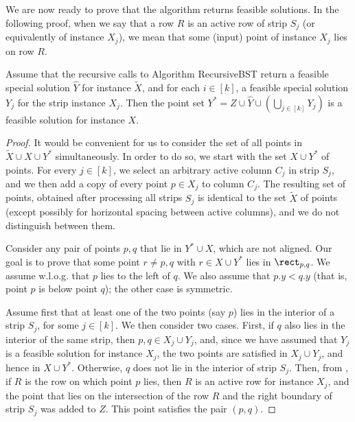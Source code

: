 We are now ready to prove that the algorithm returns feasible solutions.
In the following proof, when we say that a row $R$ is an active row of strip $S_j$ (or equivalently of instance $X_j$), we mean that some (input) point of instance $X_j$ lies on row $R$.


\begin{theorem} \label{thm: algorithm feasibility}
	Assume that the recursive calls to Algorithm {\sc RecursiveBST} return a feasible special solution $\hat Y$ for instance $\widetilde{X}$, and for each $i\in [k]$, a feasible special solution $Y_j$ for the strip instance $X_j$. Then the point set $Y^*=Z \cup \hat{Y} \cup (\bigcup_{j \in [k]} Y_j)$ is a feasible solution for instance $X$. 
\end{theorem}

\begin{proof}
	It would be convenient for us to consider the set of all points in  $\widetilde{X}\cup X\cup Y^*$ simultaneously. 
	In order to do so, we start with the set $X\cup Y^*$ of points. For every $j \in [k]$, we select an arbitrary active column $C_j$ in strip $S_j$, and we then add a copy of every point $p\in X_j$ to column $C_j$. The resulting set of points, obtained after processing all strips $S_j$ is identical to the set $\widetilde{X}$ of points (except possibly for horizontal spacing between active columns), and we do not distinguish between them.  
	
	
	Consider any pair of points $p,q$ that lie in $Y^*\cup X$, which are not aligned. Our goal is to prove that some point $r\neq p,q$ with $r\in X\cup Y^*$ lies in $\rect_{p,q}$. We assume w.l.o.g. that $p$ lies to the left of $q$. We also assume that $p.y<q.y$ (that is, point $p$ is below point $q$); the other case is symmetric.
	
	Assume first that at least one of the two points (say $p$) lies in the interior of a strip $S_j$, for some $j \in [k]$. We then consider two cases. First, if $q$ also lies in the interior of the same strip, then $p,q\in X_j \cup Y_j$, and, since we have assumed that $Y_j$ is a feasible solution for instance $X_j$, the two points are satisfied in $X_j\cup Y_j$, and hence in $X\cup Y^*$. Otherwise, $q$ does not lie in the interior of strip $S_j$. Then, from , if $R$ is the row on which point $p$ lies, then $R$ is an active row for instance $X_j$, and the point that lies on the intersection of the row $R$ and the right boundary of strip $S_j$ was added to $Z$. This point satisfies the pair $(p,q)$.


\end{proof}
